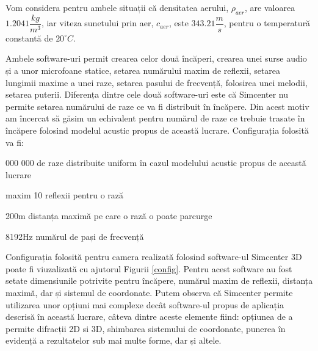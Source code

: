 	
	Vom considera pentru ambele situații c\u{a} densitatea aerului, $\rho_{aer}$, are valoarea $1.2041\dfrac{kg}{m^3}$, iar viteza sunetului prin aer, $c_{aer}$, este $343.21\dfrac{m}{s}$, pentru o temperatur\u{a} constant\u{a} de $20^{\circ}C$.

	Ambele software-uri permit crearea celor două încăperi, crearea unei surse audio și a unor microfoane statice, setarea numărului maxim de reflexii, setarea lungimii maxime a unei raze, setarea pasului de frecvență, folosirea unei melodii, setarea puterii. Diferența dintre cele două software-uri este că Simcenter nu permite setarea numărului de raze ce va fi distribuit în încăpere. Din acest motiv am încercat să găsim un echivalent pentru numărul de raze ce trebuie trasate în încăpere folosind modelul acustic propus de această lucrare. Configurația folosită va fi:
	
	\begin{itemize}
		 000 000 de raze distribuite uniform în cazul modelului acustic propus de această lucrare
		
		\utb maxim 10 reflexii pentru o rază
		
		\utb 200m distanța maximă pe care o rază o poate parcurge
		
		\utb 8192Hz numărul de pași de frecvență
	\end{itemize}	

	Configurația folosită pentru camera realizată folosind software-ul Simcenter 3D poate fi viuzalizată cu ajutorul Figurii \ref{config}. Pentru acest software au fost setate dimensiunile potrivite pentru încăpere, numărul maxim de reflexii, distanța maximă, dar și sistemul de coordonate. Putem observa că Simcenter permite utilizarea unor opțiuni mai complexe decât software-ul propus de aplicația descrisă în această lucrare, câteva dintre aceste elemente fiind: opțiunea de a permite difracții 2D si 3D, shimbarea sistemului de coordonate, punerea în evidență a rezultatelor sub mai multe forme, dar și altele.
	
